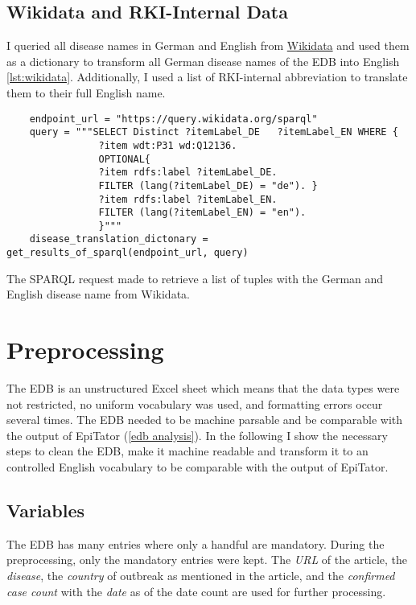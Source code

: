 \subsection{Wikidata and RKI-Internal Data}\label{wikidata}
I queried all disease names in German and English from \href{https://www.wikidata.org/wiki/Wikidata:Main_Page}{Wikidata} and used them as a dictionary to transform all German disease names of the EDB into English \ref{lst:wikidata}. Additionally, I used a list of RKI-internal abbreviation to translate them to their full English name.

\begin{listing}[h]
  \begin{verbatim}
    endpoint_url = "https://query.wikidata.org/sparql"
    query = """SELECT Distinct ?itemLabel_DE   ?itemLabel_EN WHERE {
                ?item wdt:P31 wd:Q12136.
                OPTIONAL{
                ?item rdfs:label ?itemLabel_DE.
                FILTER (lang(?itemLabel_DE) = "de"). }
                ?item rdfs:label ?itemLabel_EN.
                FILTER (lang(?itemLabel_EN) = "en").
                }"""
    disease_translation_dictonary = get_results_of_sparql(endpoint_url, query)
  \end{verbatim}
  \caption{The SPARQL request made to retrieve a list of tuples with the German and English disease name from Wikidata.}
  \label{lst:wikidata}
\end{listing}


\section{Preprocessing}
The EDB is an unstructured Excel sheet which means that the data types were not restricted, no uniform vocabulary was used, and formatting errors occur several times.
The EDB needed to be machine parsable and be comparable with the output of EpiTator (\ref{edb analysis}).
In the following I show the necessary steps to clean the EDB, make it machine readable and transform it to an controlled English vocabulary to be comparable with the output of EpiTator.

\subsection{Variables}
The EDB has many entries where only a handful are mandatory. During the preprocessing, only the mandatory entries were kept.
The \emph{URL} of the article, the \emph{disease}, the \emph{country} of outbreak as mentioned in the article, and the \emph{confirmed case count} with the \emph{date} as of the date count are used for further processing.

